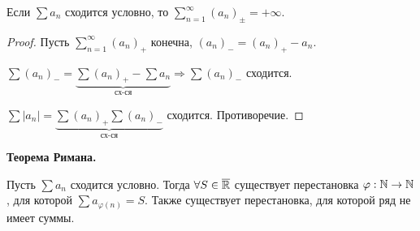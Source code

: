 \begin{remark}
    Если $\sum a_n$ сходится условно, то $\sum\limits_{n=1}^\infty (a_n)_\pm=+\infty.$
\end{remark}

\begin{proof}
    Пусть $\sum\limits_{n=1}^\infty (a_n)_+$ конечна, $(a_n)_-=(a_n)_+-a_n$.

    $\sum (a_n)_-=\underbrace{\sum (a_n)_+-\sum a_n}_{\text{сх-ся}}\Rightarrow \sum (a_n)_-$ сходится.

    $\sum |a_n|=\underbrace{\sum (a_n)_+\sum (a_n)_-}_{\text{сх-ся}}$ сходится. Противоречие.
\end{proof}

\begin{theorem}
    \textbf{Теорема Римана.}

    Пусть $\sum a_n$ сходится условно. Тогда $\forall S\in \overline{\mathbb{R}}$ существует перестановка $\varphi: \mathbb{N} \rightarrow \mathbb{N}$, для которой $\sum a_{\varphi(n)}=S$. Также существует перестановка, для которой ряд не имеет суммы.
\end{theorem}

